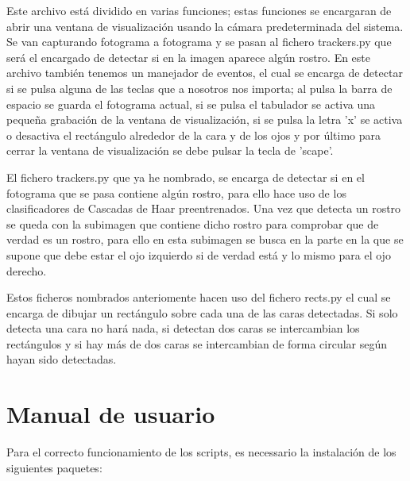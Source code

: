 \documentclass[a4paper]{article}
\begin{document}
Este archivo está dividido en varias funciones; estas funciones se encargaran de abrir una ventana de visualización usando la cámara predeterminada del sistema.
Se van capturando fotograma a fotograma y se pasan al fichero trackers.py que será el encargado de detectar si en la imagen aparece algún rostro.
En este archivo también tenemos un manejador de eventos, el cual se encarga de detectar si se pulsa alguna de las teclas que a nosotros nos importa; al pulsa la barra de espacio se guarda el fotograma actual, si se pulsa el tabulador se activa una pequeña grabación de la ventana de visualización, si se pulsa la letra 'x' se activa o desactiva el rectángulo alrededor de la cara y de los ojos y por último para cerrar la ventana de visualización se debe pulsar la tecla de 'scape'.

El fichero trackers.py que ya he nombrado, se encarga de detectar si en el fotograma que se pasa contiene algún rostro, para ello hace uso de los clasificadores de Cascadas de Haar preentrenados.
Una vez que detecta un rostro se queda con la subimagen que contiene dicho rostro para comprobar que de verdad es un rostro, para ello en esta subimagen se busca en la parte en la que se supone que debe estar el ojo izquierdo si de verdad está y lo mismo para el ojo derecho.

Estos ficheros nombrados anteriomente hacen uso del fichero rects.py el cual se encarga de dibujar un rectángulo sobre cada una de las caras detectadas. Si solo detecta una cara no hará nada, si detectan dos caras se intercambian los rectángulos y si hay más de dos caras se intercambian de forma circular según hayan sido detectadas.




\section{Manual de usuario}

Para el correcto funcionamiento de los scripts, es necessario la instalación de los siguientes paquetes:
\end{document}
